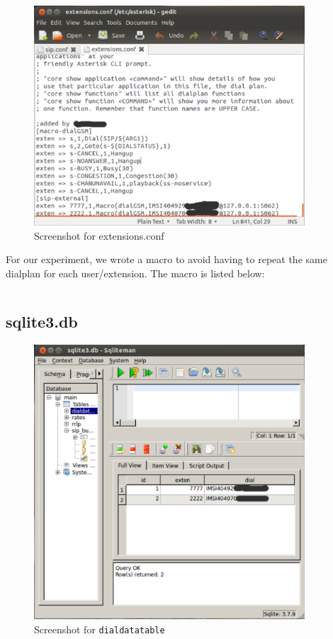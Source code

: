 \begin{figure}
  \centering
    \includegraphics[width=0.9\textwidth]{../images/ext_conf}
  \caption[Screenshot - extensions.conf]{Screenshot for \textsf{extensions.conf}}
  \label{ext_conf}
\end{figure}
For our experiment, we wrote a macro to avoid having to repeat the same 
dialplan for each user/extension. The macro is listed below:
\begin{verbatim}

\end{verbatim}


\subsection{sqlite3.db}

\begin{figure}
  \centering
    \includegraphics[width=0.9\textwidth]{../images/dialdata}
  \caption[Screenshot - dialdatatable]{Screenshot for \texttt{dialdatatable}}
  \label{dialdata}
\end{figure}

